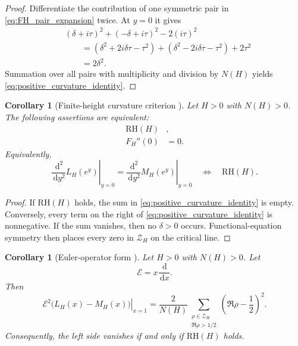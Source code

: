 \documentclass[11pt]{amsart}
\numberwithin{equation}{section}
\theoremstyle{plain}
\newtheorem{corollary}[theorem]{Corollary}
\theoremstyle{definition}
\theoremstyle{remark}
\newcommand{\RH}{\mathrm{RH}}
\newcommand{\dd}{\,\mathrm{d}}
\begin{document}
\begin{proof}
Differentiate the contribution of one symmetric pair in \eqref{eq:FH_pair_expansion} twice.  At $y=0$ it gives
\begin{align}
&(\delta+i\tau)^2+(-\delta+i\tau)^2-2(i\tau)^2
\label{eq:pair_second_derivative_first}
\\
&\qquad=
\left(\delta^2+2i\delta\tau-\tau^2\right)
+
\left(\delta^2-2i\delta\tau-\tau^2\right)
+2\tau^2
\label{eq:pair_second_derivative_second}
\\
&\qquad=2\delta^2.
\label{eq:pair_second_derivative_result}
\end{align}
Summation over all pairs with multiplicity and division by $N(H)$ yields \eqref{eq:positive_curvature_identity}.
\end{proof}

\begin{corollary}[Finite-height curvature criterion {}]
\label{cor:curvature_criterion}
Let $H>0$ with $N(H)>0$.
The following assertions are equivalent:
\begin{align}
\RH(H)
&,
\label{eq:curvature_equiv_RH}
\\
F_H''(0)&=0.
\label{eq:curvature_equiv_zero}
\end{align}
Equivalently,
\begin{equation}
\boxed{
\left.
\frac{\dd^2}{\dd y^2}
L_H(e^y)
\right|_{y=0}
=
\left.
\frac{\dd^2}{\dd y^2}
M_H(e^y)
\right|_{y=0}
\quad\Longleftrightarrow\quad
\RH(H).
}
\label{eq:second_derivative_criterion}
\end{equation}
\end{corollary}

\begin{proof}
If $\RH(H)$ holds, the sum in \eqref{eq:positive_curvature_identity} is empty.  Conversely, every term on the right of \eqref{eq:positive_curvature_identity} is nonnegative.  If the sum vanishes, then no $\delta>0$ occurs.  Functional-equation symmetry then places every zero in $\mathcal Z_H$ on the critical line.
\end{proof}

\begin{corollary}[Euler-operator form {\normalfont[Unconditional]}]
\label{cor:euler_operator}
Let $H>0$ with $N(H)>0$.
Let
\begin{equation}
\mathcal E=x\frac{\dd}{\dd x}.
\label{eq:euler_operator}
\end{equation}
Then
\begin{equation}
\boxed{
\left.
\mathcal E^2\bigl(L_H(x)-M_H(x)\bigr)
\right|_{x=1}
=
\frac{2}{N(H)}
\sum_{\substack{\rho\in\mathcal Z_H\\\Re\rho>1/2}}
\left(\Re\rho-\frac12\right)^2.
}
\label{eq:euler_operator_identity}
\end{equation}
Consequently, the left side vanishes if and only if $\RH(H)$ holds.
\end{corollary}
\end{document}
